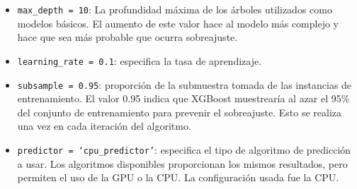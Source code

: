 \begin{description}
\begin{itemize}
		\item \texttt{max\_depth = 10}: La profundidad máxima de los árboles utilizados como modelos básicos. El aumento de este valor hace al modelo más complejo y hace que sea más probable que ocurra sobreajuste.
		\item \texttt{learning\_rate = 0.1}: especifica la tasa de aprendizaje.
		\item \texttt{subsample = 0.95}: proporción de la submuestra tomada de las instancias de entrenamiento. El valor 0.95 indica que XGBoost muestrearía al azar el 95\% del conjunto de entrenamiento para prevenir el sobreajuste. Esto se realiza una vez en cada iteración del algoritmo.
 		\item \texttt{predictor = `cpu\_predictor'}: especifica el tipo de algoritmo de predicción a usar. Los algoritmos disponibles proporcionan los mismos resultados, pero permiten el uso de la GPU o la CPU. La configuración usada fue la CPU.
	\end{itemize}
\end{description}


